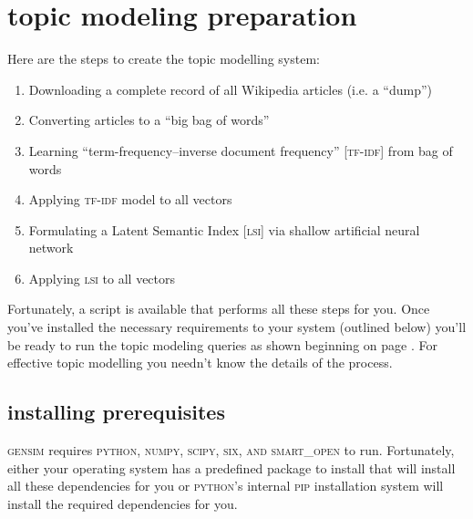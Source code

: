 \section{topic modeling preparation}
Here are the steps to create the topic modelling system:
\begin{enumerate}
  \item Downloading a complete record of all Wikipedia articles (i.e. a
    ``dump'')
  \item Converting articles to a ``big bag of words''
  \item Learning ``term-frequency–inverse document frequency'' \textsc{[tf-idf]} from bag of words
  \item Applying \textsc{tf-idf} model to all vectors
  \item Formulating a Latent Semantic Index \textsc{[lsi]} via shallow artificial neural network
    \item Applying \textsc{lsi} to all vectors
\end{enumerate}
Fortunately, a script is available  that performs all these steps for you. Once
you've installed the necessary requirements to your system (outlined below)
you'll be ready to run the topic modeling queries as shown beginning on page
\pageref{sec:relations}. For effective topic modelling you needn't know the
details of the process.

\subsection{installing prerequisites}
\textsc{gensim} requires \textsc{python, numpy, scipy, six, and smart\_open} to run.
Fortunately, either your operating system has a pre\textendash defined package
to install that will install all these dependencies for you or \textsc{python}'s
internal \textsc{pip} installation system will install the required dependencies
for you.

